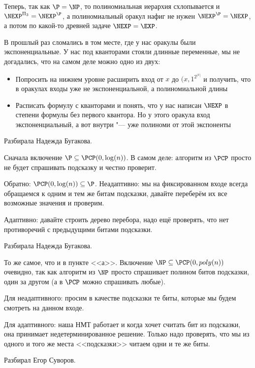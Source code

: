 	Теперь, так как $\P=\NP$, то полиномиальная иерархия схлопывается и $\NEXP^{\Pi_3}=\NEXP^{\P}$,
	а полиномиальный оракул нафиг не нужен $\NEXP^\P=\NEXP$, а потом по какой-то древней задаче $\NEXP=\EXP$.

	\begin{Rem}
		В прошлый раз сломались в том месте, где у нас оракулы были экспоненциальные.
		У нас под кванторами стояли длинные переменные, мы не догадались, что на самом деле можно одно из двух:
		\begin{itemize}
			\item Попросить на нижнем уровне расширить вход от $x$ до $(x, 1^{2^{|x|}}$ и получить, что в оракулах входы уже не экспоненциальной, а полиномиальной длины
			\item
				Расписать формулу с кванторами и понять, что у нас написан $\NEXP$ в степени формулы без первого квантора.
				Но у этого оракула вход экспоненциальный, а вот внутри "--- уже полиноми от этой экспоненты
		\end{itemize}
	\end{Rem}

	Разбирала Надежда Бугакова.

	Сначала включение $\P\subseteq \PCP(0, \log(n))$.
	В самом деле: алгоритм из $\PCP$ просто не будет спрашивать подсказку и честно проверит.

	Обратно: $\PCP(0, \log(n)) \subseteq \P$.
	Неадаптивно: мы на фиксированном входе всегда обращаемся к одним и тем же битам подсказки, давайте
	переберём их все возможные значения и проверим.

	Адаптивно: давайте строить дерево перебора, надо ещё проверять, что нет противоречий с предыдущими битами подсказки.

	Разбирала Надежда Бугакова.

	То же самое, что и в пункте <<а>>.
	Включение $\NP\subseteq \PCP(0, poly(n))$ очевидно, так как алгоритм из $\NP$ просто спрашивает
	полином битов подсказки, один за другом (а в $\PCP$ можно спрашивать любые).

	Для неадаптивного: просим в качестве подсказки те биты, которые мы будем смотреть на данном входе.

	Для адаптивного: наша НМТ работает и когда хочет считать бит из подсказки, она принимает недетерминированное решение.
	Только надо проверять, что мы из одного и того же места <<подсказки>> читаем одни и те же биты.

	Разбирал Егор Суворов.

